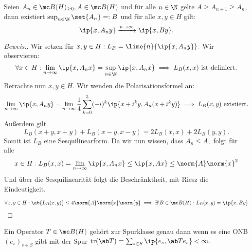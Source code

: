 \begin{theorem} Seien $A_n \in \mc B(H)_{\geq 0}, A \in \mc B(H)$ und für alle $n \in \N$ gelte $A \geq A_{n+1} \geq A_n,$ dann existiert $\sup_{n\in \N}\set{A_n} =: B$ und für alle $x, y \in H$ gilt: \[\ip{x, A_n y} \xrightarrow{n \to \infty} \ip{x, By}.\]
	
	
	\begin{proof}[Beweis:] Wir setzen für $x, y \in H: L_B = \lime{n}{\ip{ x, A_ny}}.$ Wir observieren: \[\forall x \in H: \lim_{n \to \infty} \ip{x, A_nx} = \sup_{n \in \N}{\ip{x, A_nx}} \implies L_B(x,x) \text{ ist definiert.}\] Betrachte nun $x, y \in H.$ Wir wenden die Polarisationsformel an: \[\lim_{n \to \infty} \ip{x, A_n y} = \lim_{n \to \infty} \frac{1}{4} \sum^3_{k = 0}(-i)^k \ip{x+i^k y, A_n (x + i^k y)} \implies L_B(x, y) \text{ existiert.}\] Außerdem gilt \[L_B(x+y, x+y) + L_B(x - y, x-y) = 2L_B(x, x) + 2L_B(y, y).\] Somit ist $L_B$ eine Sesquilinearform. Da wir nun wissen, dass $A_n \leq A,$ folgt für alle \[x \in H: L_B(x, x) = \lim_{n \to \infty} \ip{x, A_nx} \leq \ip{x, Ax} \leq \norm{A} \norm{x}^2\] Und über die Sesquilinearität folgt die Beschränktheit, mit Riesz die Eindeutigkeit.
		
		\[\forall x, y \in H: \ab{L_B(x, y)} \leq 4 \norm{A} \norm{x} \norm{y} \implies \exists ! B \in \mc B(H): L_B(x, y) = \ip{x, By}\]
		
	\end{proof}
	
\end{theorem}


\begin{definition} Ein Operator $T \in \mc B(H)$ gehört zur Spurklasse genau dann wenn es eine ONB $(e_s)_{s \in S}$ gibt mit der Spur $\text{tr}(\ab T) = \sum_{s \in S} \ip{e_s, \ab Te_s} < \infty.$
	
\end{definition}


